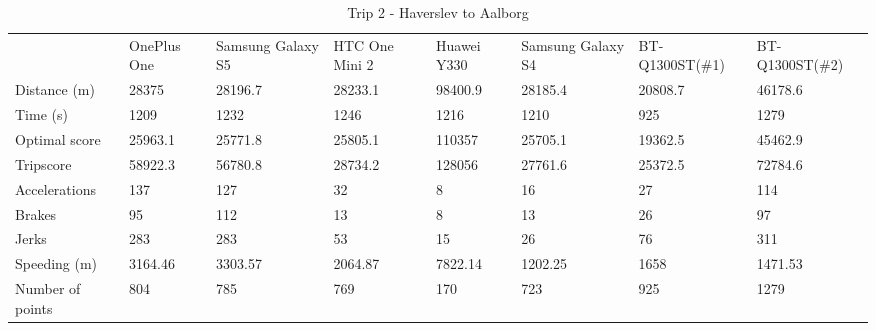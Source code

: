 \begin{table*}[tb]
\centering
\caption{Trip 2 - Haverslev to Aalborg}
\label{my-label}
\begin{tabular}{llllllll}
                 & OnePlus One & Samsung Galaxy S5 & HTC One Mini 2 & Huawei Y330 & Samsung Galaxy S4 & BT-Q1300ST(\#1) & BT-Q1300ST(\#2) \\
Distance (m)     & 28375       & 28196.7           & 28233.1        & 98400.9     & 28185.4           & 20808.7         & 46178.6         \\
Time (s)         & 1209        & 1232              & 1246           & 1216        & 1210              & 925             & 1279            \\
Optimal score    & 25963.1     & 25771.8           & 25805.1        & 110357      & 25705.1           & 19362.5         & 45462.9         \\
Tripscore        & 58922.3     & 56780.8           & 28734.2        & 128056      & 27761.6           & 25372.5         & 72784.6         \\
Accelerations    & 137         & 127               & 32             & 8           & 16                & 27              & 114             \\
Brakes           & 95          & 112               & 13             & 8           & 13                & 26              & 97              \\
Jerks            & 283         & 283               & 53             & 15          & 26                & 76              & 311             \\
Speeding (m)     & 3164.46     & 3303.57           & 2064.87        & 7822.14     & 1202.25           & 1658            & 1471.53         \\
Number of points & 804         & 785               & 769            & 170         & 723               & 925             & 1279           
\end{tabular}
\end{table*}

